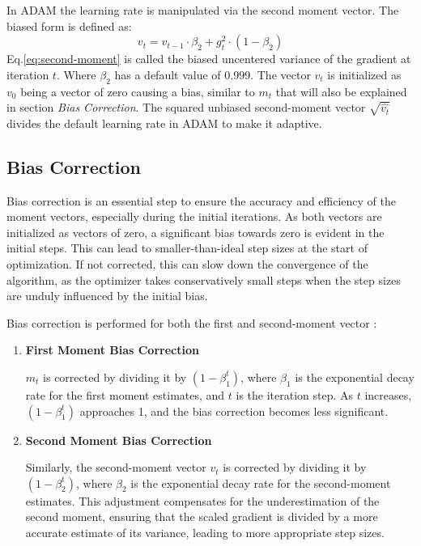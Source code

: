 \documentclass[oneside]{article}
\begin{document}
In ADAM the learning rate is manipulated via the second moment vector. The biased form is defined as:
\begin{equation}
    v_t = v_{t-1} \cdot \beta_2 + g_t^2 \cdot (1-\beta_2)
    \label{eq:second-moment}
\end{equation}
Eq.\ref{eq:second-moment} is called the biased uncentered variance of the gradient at iteration $t$. Where $\beta_2$ has a default value of 0.999. The vector $v_t$ is initialized as $v_0$ being a vector of zero causing a bias, similar to $m_t$ that will also be explained in section \textit{Bias Correction}. The squared unbiased second-moment vector $\sqrt{\hat{v_t}}$ divides the default learning rate in ADAM to make it adaptive.
\subsection{Bias Correction}
Bias correction is an essential step to ensure the accuracy and efficiency of the moment vectors, especially during the initial iterations. As both vectors are initialized as vectors of zero, a significant bias towards zero is evident in the initial steps. This can lead to smaller-than-ideal step sizes at the start of optimization. If not corrected, this can slow down the convergence of the algorithm, as the optimizer takes conservatively small steps when the step sizes are unduly influenced by the initial bias.\par
Bias correction is performed for both the first and second-moment vector :
\begin{enumerate}
    \item \textbf{First Moment Bias Correction}\par
    \(m_t\) is corrected by dividing it by \((1 - \beta_1^t)\), where \(\beta_1\) is the exponential decay rate for the first moment estimates, and \(t\) is the iteration step. As \(t\) increases, \((1 - \beta_1^t)\) approaches 1, and the bias correction becomes less significant.
    \item \textbf{Second Moment Bias Correction}\par
    Similarly, the second-moment vector \(v_t\) is corrected by dividing it by \((1 - \beta_2^t)\), where \(\beta_2\) is the exponential decay rate for the second-moment estimates. This adjustment compensates for the underestimation of the second moment, ensuring that the scaled gradient is divided by a more accurate estimate of its variance, leading to more appropriate step sizes.
\end{enumerate}
\end{document}
